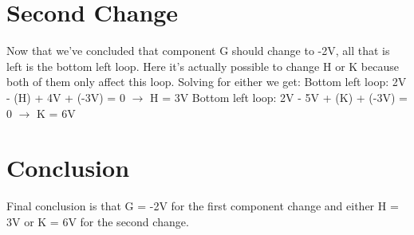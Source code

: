 \documentclass{article}
\begin{document}
\section{Second Change}
Now that we've concluded that component G should change
to -2V, all that is left is the bottom left loop. Here it's
actually possible to change H or K because both of them only
affect this loop.
\newline
\newline
Solving for either we get:
\newline
Bottom left loop: 2V - (H) + 4V + (-3V) = 0 $\rightarrow$ H = 3V
\newline
Bottom left loop: 2V - 5V + (K) + (-3V) = 0 $\rightarrow$ K = 6V

\section{Conclusion}
Final conclusion is that G = -2V for the first component
change and either H = 3V or K = 6V for the second change.
\end{document}
